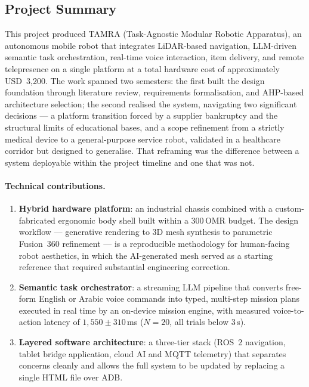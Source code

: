 \documentclass[11pt,a4paper]{article}
\begin{document}
\subsection{Project Summary}

This project produced TAMRA (Task-Agnostic Modular Robotic Apparatus), an autonomous mobile robot that integrates LiDAR-based navigation, LLM-driven semantic task orchestration, real-time voice interaction, item delivery, and remote telepresence on a single platform at a total hardware cost of approximately USD~3{,}200. The work spanned two semesters: the first built the design foundation through literature review, requirements formalisation, and AHP-based architecture selection; the second realised the system, navigating two significant decisions --- a platform transition forced by a supplier bankruptcy and the structural limits of educational bases, and a scope refinement from a strictly medical device to a general-purpose service robot, validated in a healthcare corridor but designed to generalise. That reframing was the difference between a system deployable within the project timeline and one that was not.

\paragraph{Technical contributions.}
\begin{enumerate}
  \item \textbf{Hybrid hardware platform}: an industrial chassis combined with a custom-fabricated ergonomic body shell built within a 300\,OMR budget. The design workflow --- generative rendering to 3D mesh synthesis to parametric Fusion~360 refinement --- is a reproducible methodology for human-facing robot aesthetics, in which the AI-generated mesh served as a starting reference that required substantial engineering correction.
  \item \textbf{Semantic task orchestrator}: a streaming LLM pipeline that converts free-form English or Arabic voice commands into typed, multi-step mission plans executed in real time by an on-device mission engine, with measured voice-to-action latency of $1{,}550 \pm 310$\,ms ($N=20$, all trials below 3\,s).
  \item \textbf{Layered software architecture}: a three-tier stack (ROS~2 navigation, tablet bridge application, cloud AI and MQTT telemetry) that separates concerns cleanly and allows the full system to be updated by replacing a single HTML file over ADB.
\end{enumerate}
\end{document}
